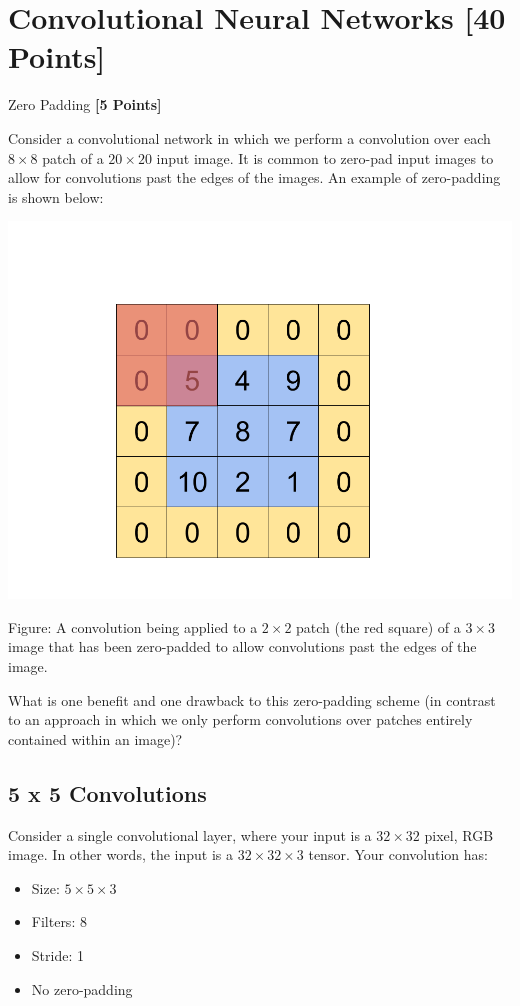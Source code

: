  \newpage
 \section{Convolutional Neural Networks  [40 Points]}
 \problem Zero Padding \textbf{[5 Points]}

 Consider a convolutional network in which we perform a convolution over each $8 \times 8$ patch of a $20 \times 20$ input image. It is common to zero-pad input images to allow for convolutions past the edges of the images. An example of zero-padding is shown below:

\begin{center}
  \includegraphics[width=.49\textwidth]{../figs/ConvolutionExample.png}
\end{center}
\begin{small}
Figure: A convolution being applied to a $2 \times 2$ patch (the red square) of a $3 \times 3$ image that has been zero-padded to allow convolutions past the edges of the image.
\end{small}

What is one benefit and one drawback to this zero-padding scheme (in contrast to an approach in which we only perform convolutions over patches entirely contained within an image)?

\begin{solution}

\end{solution}

\newpage


\subsection{5 x 5 Convolutions}
Consider a single convolutional layer, where your input is a $32 \times 32$ pixel, RGB image. In other words, the input is a $32 \times 32 \times 3$ tensor. Your convolution has:

\begin{itemize}
\item Size: $5 \times 5 \times 3$
\item Filters: 8
\item Stride: 1
\item No zero-padding
\end{itemize}

